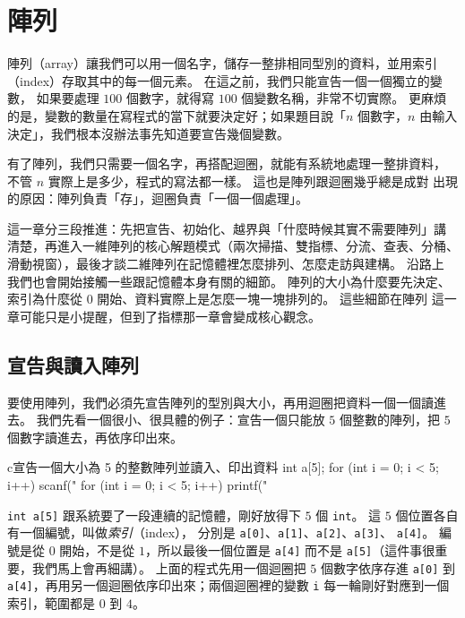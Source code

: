 \chapter{陣列}
\label{ch:array}

陣列（array）讓我們可以用一個名字，儲存一整排相同型別的資料，並用索引
（index）存取其中的每一個元素。 在這之前，我們只能宣告一個一個獨立的變數，
如果要處理 $100$ 個數字，就得寫 $100$ 個變數名稱，非常不切實際。 更麻煩
的是，變數的數量在寫程式的當下就要決定好；如果題目說「$n$ 個數字，$n$
由輸入決定」，我們根本沒辦法事先知道要宣告幾個變數。

有了陣列，我們只需要一個名字，再搭配迴圈，就能有系統地處理一整排資料，
不管 $n$ 實際上是多少，程式的寫法都一樣。 這也是陣列跟迴圈幾乎總是成對
出現的原因：陣列負責「存」，迴圈負責「一個一個處理」。

這一章分三段推進：先把宣告、初始化、越界與「什麼時候其實不需要陣列」講
清楚，再進入一維陣列的核心解題模式（兩次掃描、雙指標、分流、查表、分桶、
滑動視窗），最後才談二維陣列在記憶體裡怎麼排列、怎麼走訪與建構。 沿路上
我們也會開始接觸一些跟記憶體本身有關的細節。 陣列的大小為什麼要先決定、
索引為什麼從 $0$ 開始、資料實際上是怎麼一塊一塊排列的。 這些細節在陣列
這一章可能只是小提醒，但到了指標那一章會變成核心觀念。

\section{宣告與讀入陣列}
\label{sec:array-declare-read}

要使用陣列，我們必須先宣告陣列的型別與大小，再用迴圈把資料一個一個讀進去。
我們先看一個很小、很具體的例子：宣告一個只能放 $5$ 個整數的陣列，把 $5$
個數字讀進去，再依序印出來。

\begin{code}{c}{宣告一個大小為 5 的整數陣列並讀入、印出資料}
int a[5];
for (int i = 0; i < 5; i++) {
    scanf("%
}
for (int i = 0; i < 5; i++) {
    printf("%
}
\end{code}

\texttt{int a[5]} 跟系統要了一段連續的記憶體，剛好放得下 $5$ 個
\texttt{int}。 這 $5$ 個位置各自有一個編號，叫做\emph{索引}（index），
分別是 \texttt{a[0]}、\texttt{a[1]}、\texttt{a[2]}、\texttt{a[3]}、
\texttt{a[4]}。 編號是從 $0$ 開始，不是從 $1$，所以最後一個位置是
\texttt{a[4]} 而不是 \texttt{a[5]}（這件事很重要，我們馬上會再細講）。
上面的程式先用一個迴圈把 $5$ 個數字依序存進 \texttt{a[0]} 到
\texttt{a[4]}，再用另一個迴圈依序印出來；兩個迴圈裡的變數 \texttt{i}
每一輪剛好對應到一個索引，範圍都是 $0$ 到 $4$。

